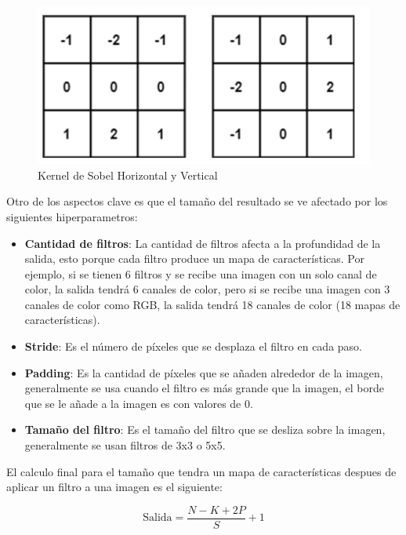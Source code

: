 \begin{figure}[ht!]
    \centering
    \includegraphics[width=\linewidth]{src/figures/sobel_kernel.png}
    \caption{Kernel de Sobel Horizontal y Vertical \cite{sobel_kernel}}
    \label{fig:sobel_kernel}
\end{figure}

Otro de los aspectos clave es que el tamaño del resultado se ve 
afectado por los siguientes hiperparametros:

\begin{itemize}
    \item \textbf{Cantidad de filtros}:
    La cantidad de filtros afecta a la profundidad de la salida, 
    esto porque cada filtro produce un mapa de características. 
    Por ejemplo, si se tienen 6 filtros y se recibe una imagen con 
    un solo canal de color, la salida tendrá 6 canales de color, pero
    si se recibe una imagen con 3 canales de color como RGB, la salida
    tendrá 18 canales de color (18 mapas de características).
    \item \textbf{Stride}:
    Es el número de píxeles que se desplaza el filtro en cada paso.
    \item \textbf{Padding}:
    Es la cantidad de píxeles que se añaden alrededor de la imagen, 
    generalmente se usa cuando el filtro es más grande que la imagen, 
    el borde que se le añade a la imagen es con valores de 0.
    \item \textbf{Tamaño del filtro}:
    Es el tamaño del filtro que se desliza sobre la imagen, generalmente
    se usan filtros de 3x3 o 5x5.
\end{itemize}

El calculo final para el tamaño que tendra un mapa de características
despues de aplicar un filtro a una imagen es el siguiente:

\begin{equation}
    \text{Salida} = \frac{N - K + 2P}{S} + 1
\end{equation}

